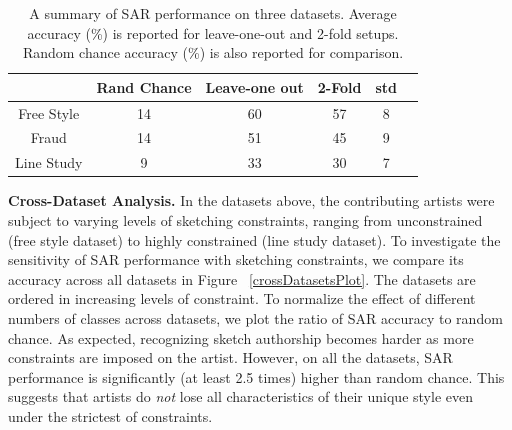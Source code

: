 

\begin{table}[htbp!]
\caption {A summary of SAR performance on three datasets. Average accuracy (\%) is reported for leave-one-out and 2-fold setups. Random chance accuracy (\%) is also reported for comparison.}
\label{table:accuracy}
\vspace{-2mm}
\centering
\small
\begin{tabular}{cccccc}
&Rand Chance &Leave-one out & 2-Fold &std \\ \hline

Free Style           & 14 & 60 & 57 & 8\\
Fraud                & 14 & 51 & 45 & 9\\
Line Study           & 9  & 33 & 30 & 7\\
\end{tabular}
\end{table}

\noindent\textbf{Cross-Dataset Analysis.} In the datasets above, the contributing artists were subject to varying levels of sketching constraints, ranging from unconstrained (free style dataset) to highly constrained (line study dataset). To investigate the sensitivity of SAR performance with sketching constraints, we compare its accuracy across all datasets in Figure ~\ref{crossDatasetsPlot}. The datasets are ordered in increasing levels of constraint. To normalize the effect of different numbers of classes across datasets, we plot the ratio of SAR accuracy to random chance. As expected, recognizing sketch authorship becomes harder as more constraints are imposed on the artist. However, on all the datasets, SAR performance is significantly (at least 2.5 times) higher than random chance. This suggests that artists do \emph{not} lose all characteristics of their unique style even under the strictest of constraints.

